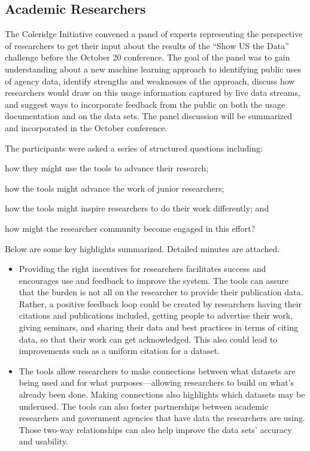 \documentclass[titlepage, 11pt]{article}
\begin{document}
{\subsection*{Academic Researchers}\label{subsec:AcademicResearchers}
The Coleridge Initiative convened a panel of experts representing the perspective of researchers to get their input about the results of the “Show US the Data” challenge before the October 20 conference. The goal of the panel was to gain understanding about a new machine learning approach to identifying public uses of agency data, identify strengths and weaknesses of the approach, discuss how researchers would draw on this usage information captured by live data streams, and suggest ways to incorporate feedback from the public on both the usage documentation and on the data sets.  The panel discussion will be summarized and incorporated in the October conference.

The participants were asked a series of structured questions including: \begin{enumerate*}[label=(\arabic*)]
    \item how they might use the tools to advance their research;
    \item how the tools might advance the work of junior researchers; 
    \item how the tools might inspire researchers to do their work differently; and 
    \item how might the researcher community become engaged in this effort? 
\end{enumerate*}  Below are some key highlights summarized.  Detailed minutes are attached.
\begin{itemize}
    \item Providing the right incentives for researchers facilitates success and encourages use and feedback to improve the system. The tools can assure that the burden is not all on the researcher to provide their publication data. Rather, a positive feedback loop could be created by researchers having their citations and publications included, getting people to advertise their work, giving seminars, and sharing their data and best practices in terms of citing data, so that their work can get acknowledged. This also could lead to improvements such as a uniform citation for a dataset. 
    \item The tools allow researchers to make connections between what datasets are being used and for what purposes—allowing researchers to build on what’s already been done. Making connections also highlights which datasets may be underused. The tools can also foster partnerships between academic researchers and government agencies that have data the researchers are using. Those two-way relationships can also help improve the data sets’ accuracy and usability.
\end{itemize}

}
\end{document}
